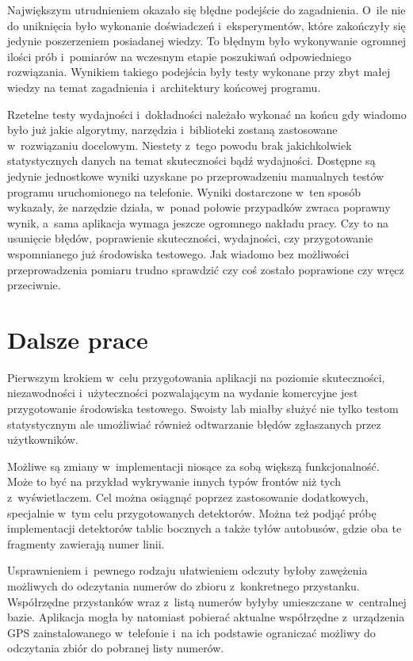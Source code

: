 Największym utrudnieniem okazało się błędne podejście do zagadnienia. 
O~ile nie do uniknięcia było wykonanie doświadczeń i~eksperymentów,
które zakończyły się jedynie poszerzeniem posiadanej wiedzy.
To błędnym było wykonywanie ogromnej ilości prób i~pomiarów na
wczesnym etapie poszukiwań odpowiedniego rozwiązania. 
Wynikiem takiego podejścia były testy wykonane przy zbyt małej 
wiedzy na temat zagadnienia i~architektury końcowej programu. 

Rzetelne testy wydajności i~dokładności należało wykonać na końcu
gdy wiadomo było już jakie algorytmy, narzędzia i~biblioteki zostaną
zastosowane w~rozwiązaniu docelowym. Niestety z~tego powodu
brak jakichkolwiek statystycznych danych na temat skuteczności
bądź wydajności. Dostępne są jedynie jednostkowe wyniki uzyskane po
przeprowadzeniu manualnych testów programu uruchomionego na telefonie.
Wyniki dostarczone w~ten sposób wykazały, że narzędzie działa,
w~ponad połowie przypadków zwraca poprawny wynik, a~sama aplikacja
wymaga jeszcze ogromnego nakładu pracy. Czy to na usunięcie błędów,
poprawienie skuteczności, wydajności, czy przygotowanie 
wspomnianego już środowiska testowego. Jak wiadomo bez możliwości
przeprowadzenia pomiaru trudno sprawdzić czy coś zostało 
poprawione czy wręcz przeciwnie.

\section{Dalsze prace}

Pierwszym krokiem w~celu przygotowania aplikacji na poziomie 
skuteczności, niezawodności i~użyteczności pozwalającym na 
wydanie komercyjne jest przygotowanie środowiska testowego. 
Swoisty lab miałby służyć nie tylko testom statystycznym ale 
umożliwiać również odtwarzanie błędów zgłaszanych przez użytkowników.

Możliwe są zmiany w~implementacji niosące za sobą większą funkcjonalność.
Może to być na przykład wykrywanie innych typów frontów niż 
tych z~wyświetlaczem. Cel można osiągnąć poprzez zastosowanie 
dodatkowych, specjalnie w~tym celu przygotowanych detektorów. Można też 
podjąć próbę implementacji detektorów tablic bocznych a także tyłów 
autobusów, gdzie oba te fragmenty zawierają numer linii.

Usprawnieniem i~pewnego rodzaju ułatwieniem odczuty byłoby zawężenia
możliwych do odczytania numerów do zbioru z~konkretnego przystanku. 
Współrzędne przystanków wraz z~listą numerów byłyby umieszczane 
w~centralnej bazie. Aplikacja mogła by natomiast pobierać aktualne 
współrzędne z~urządzenia GPS zainstalowanego w~telefonie i~na ich podstawie
ograniczać możliwy do odczytania zbiór do pobranej listy numerów.


